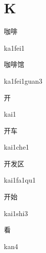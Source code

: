 ﻿%
\section*{K}

\begin{verbete}[ka1fei1]{咖啡}
\begin{pronuncia}{ka1fei1}
\end{pronuncia}
\end{verbete}

\begin{verbete}{咖啡馆}
\begin{pronuncia}{ka1fei1guan3}
\end{pronuncia}
\end{verbete}

\begin{verbete}[kai1]{开}
\begin{pronuncia}{kai1}
\end{pronuncia}
\end{verbete}

\begin{verbete}{开车}
\begin{pronuncia}{kai1che1}
\end{pronuncia}
\end{verbete}

\begin{verbete}[kai1fa1qu1]{开发区}
\begin{pronuncia}{kai1fa1qu1}
\end{pronuncia}
\end{verbete}

\begin{verbete}{开始}
\begin{pronuncia}{kai1shi3}
\end{pronuncia}
\end{verbete}

\begin{verbete}[kan4]{看}
\begin{pronuncia}{kan4}
\end{pronuncia}
\end{verbete}

